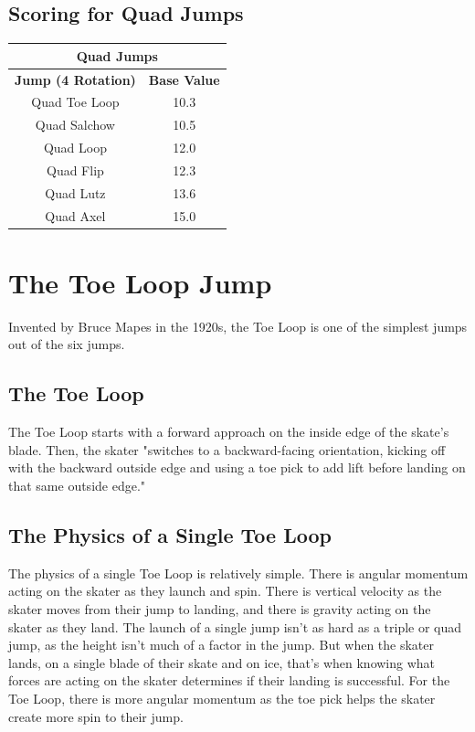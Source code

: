 \documentclass[12pt,journal,compsoc]{IEEEtran}
\begin{document}
\subsection{Scoring for Quad Jumps}
\begin{center}
  \begin{tabular}{|c|c|}
  	\hline
	\multicolumn{2}{|c|}{Quad Jumps}  \\
	\hline
    \textbf{Jump (4 Rotation)} & \textbf{Base Value}\\
    \hline
    Quad Toe Loop & 10.3 \\
    \hline
    Quad Salchow & 10.5 \\
    \hline
    Quad Loop & 12.0 \\
    \hline
    Quad Flip & 12.3 \\
    \hline
    Quad Lutz & 13.6 \\
    \hline
    Quad Axel & 15.0 \\
    \hline
  \end{tabular}
\end{center}


\section{The Toe Loop Jump}
Invented by Bruce Mapes in the 1920s, the Toe Loop is one of the simplest jumps out of the six jumps. 

\subsection{The Toe Loop}
The Toe Loop starts with a forward approach on the inside edge of the skate's blade. Then, the skater "switches to a backward-facing orientation, kicking off with the backward outside edge and using a toe pick to add lift before landing on that same outside edge."

\subsection{The Physics of a Single Toe Loop}
The physics of a single Toe Loop is relatively simple. There is angular momentum acting on the skater as they launch and spin. There is vertical velocity as the skater moves from their jump to landing, and there is gravity acting on the skater as they land. The launch of a single jump isn't as hard as a triple or quad jump, as the height isn't much of a factor in the jump. But when the skater lands, on a single blade of their skate and on ice, that's when knowing what forces are acting on the skater determines if their landing is successful. For the Toe Loop, there is more angular momentum as the toe pick helps the skater create more spin to their jump. 
\end{document}
